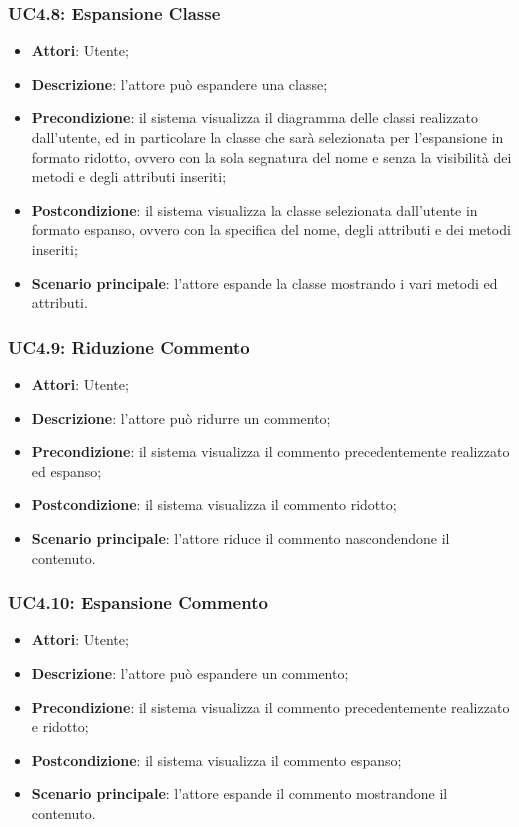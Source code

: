 \begin{itemize}
\begin{itemize}
\begin{itemize}
\begin{itemize}
\subsubsection{UC4.8: Espansione Classe}
\label{UC4.8}
\begin{itemize}
	\item \textbf{Attori}: Utente;
	\item \textbf{Descrizione}: l'attore può espandere una classe;
	\item \textbf{Precondizione}: il sistema visualizza il diagramma delle classi realizzato dall'utente, ed in particolare la classe che sarà selezionata per l'espansione in formato ridotto, ovvero con la sola segnatura del nome e senza la visibilità dei metodi e degli attributi inseriti;
	\item \textbf{Postcondizione}: il sistema visualizza la classe selezionata dall'utente in formato espanso, ovvero con la specifica del nome, degli attributi e dei metodi inseriti;
	\item \textbf{Scenario principale}: l'attore espande la classe mostrando i vari metodi ed attributi.
\end{itemize}

\subsubsection{UC4.9: Riduzione Commento}
\label{UC4.9}
\begin{itemize}
	\item \textbf{Attori}: Utente;
	\item \textbf{Descrizione}: l'attore può ridurre un commento;
	\item \textbf{Precondizione}: il sistema visualizza il commento precedentemente realizzato ed espanso;
	\item \textbf{Postcondizione}: il sistema visualizza il commento ridotto;
	\item \textbf{Scenario principale}: l'attore riduce il commento nascondendone il contenuto.
\end{itemize}

\subsubsection{UC4.10: Espansione Commento}
\label{UC4.10}
\begin{itemize}
	\item \textbf{Attori}: Utente;
	\item \textbf{Descrizione}: l'attore può espandere un commento;
	\item \textbf{Precondizione}: il sistema visualizza il commento precedentemente realizzato e ridotto;
	\item \textbf{Postcondizione}: il sistema visualizza il commento espanso;
	\item \textbf{Scenario principale}: l'attore espande il commento mostrandone il contenuto.
\end{itemize}


\end{itemize}
\end{itemize}
\end{itemize}
\end{itemize}
